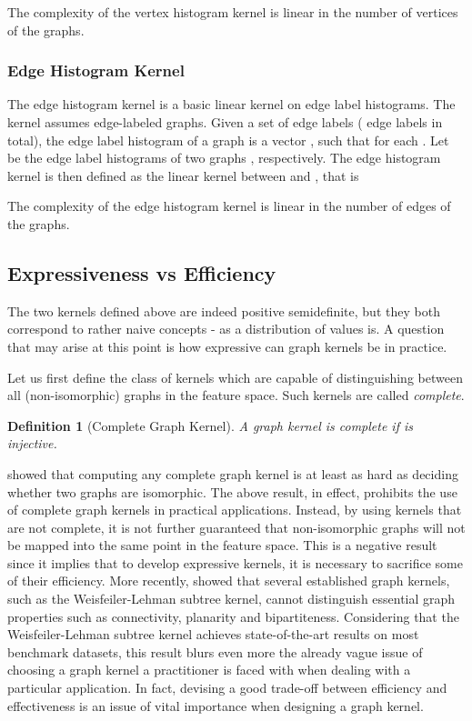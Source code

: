 \documentclass[twoside,11pt]{article}
\newtheorem{definition}{Definition}
\begin{document}
The complexity of the vertex histogram kernel is linear in the number of vertices of the graphs.

\subsubsection{Edge Histogram Kernel}
The edge histogram kernel is a basic linear kernel on edge label histograms.
The kernel assumes edge-labeled graphs.
Given a set of edge labels  ( edge labels in total), the edge label histogram of a graph  is a vector , such that  for each .
Let  be the edge label histograms of two graphs , respectively.
The edge histogram kernel is then defined as the linear kernel between  and , that is

The complexity of the edge histogram kernel is linear in the number of edges of the graphs.

\subsection{Expressiveness vs Efficiency}
The two kernels defined above are indeed positive semidefinite, but they both correspond to rather naive concepts - as a distribution of values is.
A question that may arise at this point is how expressive can graph kernels be in practice.


Let us first define the class of kernels which are capable of distinguishing between all (non-isomorphic) graphs in the feature space.
Such kernels are called \textit{complete}.
\begin{definition}[Complete Graph Kernel]
  A graph kernel  is complete if  is injective.
\end{definition}
 showed that computing any complete graph kernel is at least as hard as deciding whether two graphs are isomorphic.
The above result, in effect, prohibits the use of complete graph kernels in practical applications.
Instead, by using kernels that are not complete, it is not further guaranteed that non-isomorphic graphs will not be mapped into the same point in the feature space.
This is a negative result since it implies that to develop expressive kernels, it is necessary to sacrifice some of their efficiency.
More recently,  showed that several established graph kernels, such as the Weisfeiler-Lehman subtree kernel, cannot distinguish essential graph properties such as connectivity, planarity and bipartiteness.
Considering that the Weisfeiler-Lehman subtree kernel achieves state-of-the-art results on most benchmark datasets, this result blurs even more the already vague issue of choosing a graph kernel a practitioner is faced with when dealing with a particular application.
In fact, devising a good trade-off between efficiency and effectiveness is an issue of vital importance when designing a graph kernel.
\end{document}
